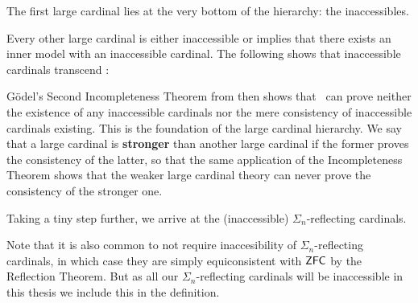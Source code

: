 \documentclass[../../main]{subfiles}
\begin{document}
The first large cardinal lies at the very bottom of the hierarchy: the inaccessibles.


Every other large cardinal is either inaccessible or implies that there exists an inner model with an inaccessible cardinal. The following shows that inaccessible cardinals transcend \zfc:


G\"odel's Second Incompleteness Theorem from \cite{godel-incompleteness} then shows that \zfc\ can prove neither the existence of any inaccessible cardinals nor the mere consistency of inaccessible cardinals existing. This is the foundation of the large cardinal hierarchy. We say that a large cardinal is \textbf{stronger} than another large cardinal if the former proves the consistency of the latter, so that the same application of the Incompleteness Theorem shows that the weaker large cardinal theory can never prove the consistency of the stronger one.

\qquad Taking a tiny step further, we arrive at the (inaccessible) $\Sigma_n$-reflecting cardinals.


Note that it is also common to not require inaccesibility of $\Sigma_n$-reflecting cardinals, in which case they are simply equiconsistent with $\textsf{ZFC}$ by the Reflection Theorem. But as all our $\Sigma_n$-reflecting cardinals will be inaccessible in this thesis we include this in the definition.
\end{document}
